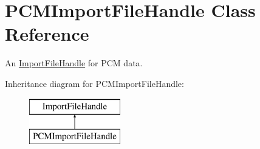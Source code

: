 \hypertarget{class_p_c_m_import_file_handle}{}\section{P\+C\+M\+Import\+File\+Handle Class Reference}
\label{class_p_c_m_import_file_handle}


An \hyperlink{class_import_file_handle}{Import\+File\+Handle} for P\+CM data.  


Inheritance diagram for P\+C\+M\+Import\+File\+Handle\+:\begin{figure}[H]
\begin{center}
\leavevmode
\includegraphics[height=2.000000cm]{class_p_c_m_import_file_handle}
\end{center}
\end{figure}
